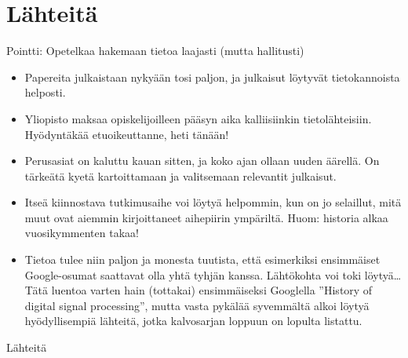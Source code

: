 \documentclass[pdf,9pt,handout]{beamer}
\begin{document}
\section{Lähteitä}

\begin{frame}{Pointti: Opetelkaa hakemaan tietoa laajasti (mutta hallitusti)}
  \begin{itemize}
  \item
    Papereita julkaistaan nykyään tosi paljon, ja julkaisut löytyvät
    tietokannoista helposti. 
  \item Yliopisto maksaa opiskelijoilleen pääsyn aika kalliisiinkin
    tietolähteisiin. Hyödyntäkää etuoikeuttanne, heti tänään!
  \item Perusasiat on kaluttu kauan sitten, ja
    koko ajan ollaan uuden äärellä. On tärkeätä kyetä kartoittamaan ja
    valitsemaan relevantit julkaisut.
  \item Itseä kiinnostava tutkimusaihe voi löytyä helpommin, kun on jo
    selaillut, mitä muut ovat aiemmin kirjoittaneet aihepiirin
    ympäriltä. Huom: historia alkaa vuosikymmenten takaa!
  \item Tietoa tulee niin paljon ja monesta tuutista, että esimerkiksi
    ensimmäiset Google-osumat saattavat olla yhtä tyhjän
    kanssa. Lähtökohta voi toki löytyä\ldots Tätä luentoa varten hain
    (tottakai) ensimmäiseksi Googlella ''History of digital signal
    processing'', mutta vasta pykälää syvemmältä alkoi löytyä
    hyödyllisempiä lähteitä, jotka kalvosarjan loppuun on lopulta
    listattu.
  \end{itemize}
\end{frame}

\beamerdefaultoverlayspecification{}
\begin{frame}[allowframebreaks]{Lähteitä}

  \tiny
  
  

\end{frame}

\beamerdefaultoverlayspecification{<+->}
\end{document}
